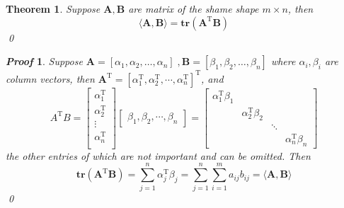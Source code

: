 \documentclass{article}
\newcommand{\Transpose}{\ensuremath{\mathrm{T}}}
\newcommand{\Trace}{\ensuremath{\mathbf{tr}}}
\newcommand{\MatrixSymbol}[1]{\ensuremath{{\boldsymbol{#1}}}}
\newtheorem{Theorem}{Theorem}[section]
\theoremstyle{nonumberplain}
\newtheorem{Proof}{\textit{\textbf{Proof}}}
\begin{document}
\begin{Theorem}\label{theorem:the relationship between inner product of matrix and its trace}
    Suppose $\MatrixSymbol{A},\MatrixSymbol{B}$ are matrix of the shame shape $m\times n$, then
    \begin{equation}
        \langle \MatrixSymbol{A},\MatrixSymbol{B} \rangle = \Trace(\MatrixSymbol{A}^\Transpose \MatrixSymbol{B})
    \end{equation}
    \qed
\end{Theorem}
\begin{Proof}
    Suppose $\MatrixSymbol{A}=[\alpha_1,\alpha_2,\dotsc,\alpha_n]\;, \MatrixSymbol{B}=[\beta_1,\beta_2,\dotsc,\beta_n]$ where $\alpha_i,\beta_i$ are column vectors, then $\MatrixSymbol{A}^\Transpose=[\alpha_1^\Transpose,\alpha_2^\Transpose,\cdots,\alpha_n^\Transpose]^\Transpose$, and 
    \begin{equation*}
        A^\Transpose B=\begin{bmatrix}
            \alpha_1^\Transpose\\
            \alpha_2^\Transpose\\
            \vdots\\
            \alpha_n^\Transpose\\
        \end{bmatrix}\begin{bmatrix}
            \beta_1,\beta_2,\cdots,\beta_n
        \end{bmatrix}=\begin{bmatrix}
            \alpha_1^\Transpose \beta_1 &&&\\
            & \alpha_2^\Transpose \beta_2 &&\\
            &&\ddots&\\
            &&&\alpha_n^\Transpose \beta_n
        \end{bmatrix}
    \end{equation*} 
    the other entries of which are not important and can be omitted. Then
    \begin{equation*}
        \Trace(\MatrixSymbol{A}^\Transpose \MatrixSymbol{B})=
        \sum_{j=1}^n \alpha_j^\Transpose \beta_j=\sum_{j=1}^n \sum_{i=1}^m a_{ij}b_{ij}=\langle \MatrixSymbol{A},\MatrixSymbol{B} \rangle
    \end{equation*}
    \qed
\end{Proof}
\end{document}
